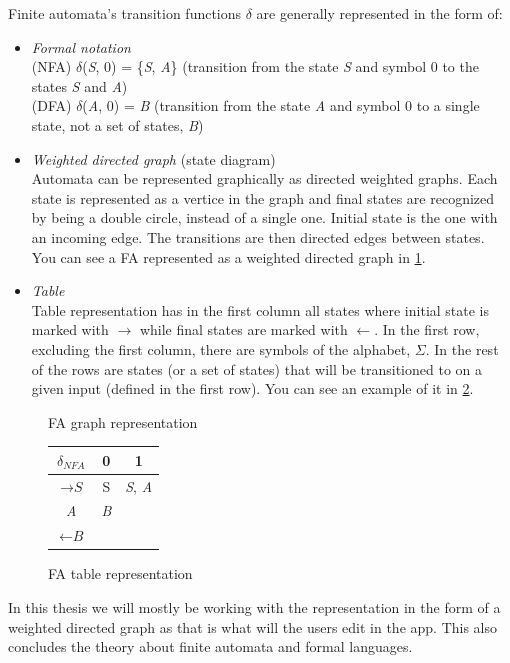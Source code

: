 Finite automata's transition functions $\delta$ are generally represented in the form of:
\begin{itemize}
    \item \textit{Formal notation}\\
    (NFA) $\delta$(\textit{S}, 0) = \{\textit{S}, \textit{A}\} (transition from the state \textit{S} and symbol 0 to the states \textit{S} and \textit{A})\\
    (DFA) $\delta$(\textit{A}, 0) = \textit{B} (transition from the state \textit{A} and symbol 0 to a single state, not a set of states, \textit{B})
    \item \textit{Weighted directed graph} (state diagram)\\
    Automata can be represented graphically as directed weighted graphs. Each state is represented as a vertice in the graph and final states are recognized by being a double circle, instead of a single one. Initial state is the one with an incoming edge. The transitions are then directed edges between states. You can see a FA represented as a weighted directed graph in \ref{graph-representation}.
    \item \textit{Table}\\
    Table representation has in the first column all states where initial state is marked with $\rightarrow$ while final states are marked with $\leftarrow$. In the first row, excluding the first column, there are symbols of the alphabet, $\Sigma$. In the rest of the rows are states (or a set of states) that will be transitioned to on a given input (defined in the first row). You can see an example of it in \ref{table-representation}.
\end{itemize}
\begin{figure}
\caption{FA graph representation}\label{graph-representation}
\end{figure}
\begin{figure}
\begin{tabular}{||c|c|c||} 
    \hline
    $\delta_{NFA}$ & 0 & 1 \\ [0.5ex] 
    \hline\hline
    $\rightarrow \textit{S}$ & S & \textit{S}, \textit{A} \\ 
    \hline
    \textit{A} & \textit{B} & \\
    \hline
    $\leftarrow \textit{B}$ &  & \\
    \hline
\end{tabular}
\caption{FA table representation}\label{table-representation}
\end{figure}
In this thesis we will mostly be working with the representation in the form of a weighted directed graph as that is what will the users edit in the app.
This also concludes the theory about finite automata and formal languages.

